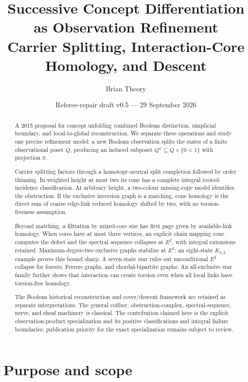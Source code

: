 \documentclass[11pt]{article}
\title{\textbf{Successive Concept Differentiation as Observation Refinement}\\
\large Carrier Splitting, Interaction-Core Homology, and Descent}
\author{Brian Theory}
\date{Referee-repair draft v0.5 --- 29 September 2026}
\begin{document}
\maketitle

\begin{abstract}
A 2015 proposal for concept unfolding combined Boolean distinction, simplicial
boundary, and local-to-global reconstruction.  We separate these operations
and study one precise refinement model: a new Boolean observation splits the
states of a finite observational poset $Q$, producing an induced subposet
$Q^\psi\subseteq Q\times\{0<1\}$ with projection $\pi$.

Carrier splitting factors through a homotopy-neutral split completion followed
by order thinning.  In weighted height at most two its cone has a complete
integral rooted-incidence classification.  At arbitrary height, a two-colour
missing-copy model identifies the obstruction.  If the exclusive inversion
graph is a matching, cone homology is the direct sum of coarse edge-link
reduced homology shifted by two, with no torsion-freeness assumption.

Beyond matching, a filtration by mixed-core size has first page given by
available-link homology.  When cores have at most three vertices, an explicit
chain mapping cone computes the defect and the spectral sequence collapses at
$E^2$, with integral extensions retained.  Maximum-degree-two exclusive graphs
stabilize at $E^3$; an eight-state $K_{2,2}$ example proves this bound sharp.
A seven-state star rules out unconditional $E^2$ collapse for forests, Ferrers
graphs, and chordal-bipartite graphs.  An all-exclusive star family further
shows that interaction can create torsion even when all local links have
torsion-free homology.

The Boolean historical reconstruction and cover/descent framework are retained
as separate interpretations.  The general cofiber, obstruction-complex,
spectral-sequence, nerve, and sheaf machinery is classical.  The contribution
claimed here is the explicit observation-product specialization and its
positive classifications and integral failure boundaries; publication priority
for the exact specialization remains subject to review.

\end{abstract}

\tableofcontents

\section{Purpose and scope}
\end{document}
